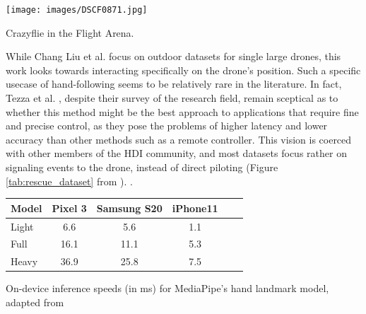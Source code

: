 \begin{marginfigure}%
  \texttt{[image: images/DSCF0871.jpg]}
  \caption{Crazyflie in the Flight Arena.}
  \label{fig:pilot_video}
\end{marginfigure}

While Chang Liu et al. focus on outdoor datasets for single large drones, this work looks towards interacting specifically on the drone's position. Such a specific usecase of hand-following seems to be relatively rare in the literature. In fact, Tezza et al. \cite{tezza_andujar_2019}, despite their survey of the research field, remain sceptical as to whether this method might be the best approach to applications that require fine and precise control, as they pose the problems of higher latency and lower accuracy than other methods such as a remote controller. This vision is coerced with other members of the HDI community, and most datasets focus rather on signaling events to the drone, instead of direct piloting (Figure \ref{tab:rescue_dataset} from  \cite{liu_szirányi_2021}). .%




\begin{margintable}%
  \raggedright
  \footnotesize%
  \vspace{2cm}
    \begin{tabular}{lccccl}
      \toprule
      Model  %
             & Pixel 3 & Samsung S20 & iPhone11 \\
      \midrule
      Light      & 6.6 & 5.6       & 1.1 \\%
      Full      & 16.1    & 11.1          & 5.3 \\ 
      Heavy        & 36.9 & 25.8               & 7.5 \\ 
      \bottomrule
    \end{tabular}
  \caption{On-device inference speeds (in ms) for MediaPipe's hand landmark model, adapted from \cite{48292}}
  \label{fig:mediapipe_alone}
\end{margintable}

